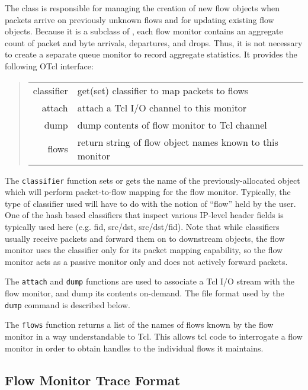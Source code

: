 The  class is responsible for managing
the creation of new flow objects when packets arrive on previously
unknown flows and for updating existing flow objects.
Because it is a subclass of , each flow monitor
contains an aggregate count of packet and byte arrivals, departures, and
drops.
Thus, it is not necessary to create a separate queue monitor to record
aggregate statistics.
It provides the following OTcl interface:
\begin{quote}
\begin{tabularx}{\linewidth}{rX}
         classifier & get(set) classifier to map packets to flows\\
         attach & attach a Tcl I/O channel to this monitor\\
         dump  & dump contents of flow monitor to Tcl channel\\
         flows & return string of flow object names known to this monitor\\
\end{tabularx}
\end{quote}

The {\tt classifier} function sets or gets the name of the previously-allocated
object which will perform packet-to-flow mapping for the flow monitor.
Typically, the type of classifier used will have to do with the notion of
``flow'' held by the user.
One of the hash based classifiers that inspect various IP-level header
fields is typically used here (e.g. fid, src/dst, src/dst/fid).
Note that while classifiers usually receive packets and forward them
on to downstream objects, the flow monitor uses the classifier only for
its packet mapping capability, so the flow monitor acts as a passive
monitor only and does not actively forward packets.

The {\tt attach} and {\tt dump} functions are used to
associate a Tcl I/O stream with the
flow monitor, and dump its contents on-demand.
The file format used by the {\tt dump} command is described below.

The {\tt flows} function returns a list of the names of flows known
by the flow monitor in a way understandable to Tcl.
This allows tcl code to interrogate a flow monitor in order
to obtain handles to the individual flows it maintains.

\subsection{Flow Monitor Trace Format}
\label{sec:flowmonclass}

